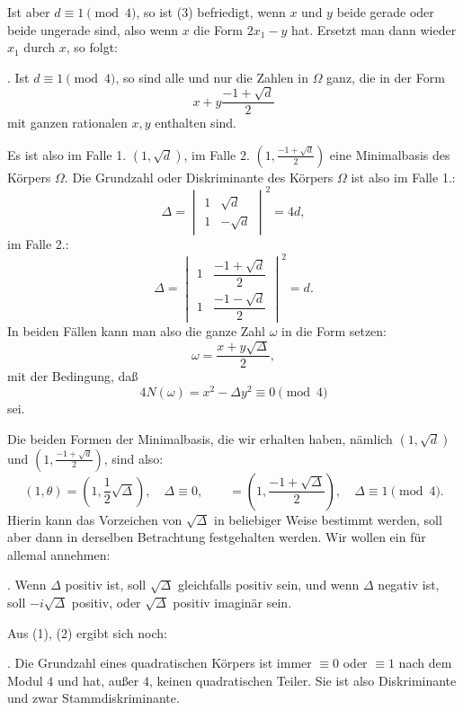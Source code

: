 \documentclass[11pt]{article}
\begin{document}
Ist aber $d\equiv1\pmod4$, so ist (3) befriedigt, wenn $x$ und $y$ beide gerade oder beide ungerade sind, also wenn $x$ die Form $2x_1-y$ hat. Ersetzt man dann wieder $x_1$ durch $x$, so folgt:

\medskip
{}. Ist $d\equiv1\pmod4$, so sind alle und nur die Zahlen in $\Omega$ ganz, die in der Form
\[
 x+y\frac{-1+\sqrt d}{2}
\]
mit ganzen rationalen $x,y$ enthalten sind.
\medskip

Es ist also im Falle 1. $(1,\sqrt d)$, im Falle 2. $\left(1,\frac{-1+\sqrt d}{2}\right)$ eine Minimalbasis des Körpers $\Omega$. Die Grundzahl oder Diskriminante des Körpers $\Omega$ ist also im Falle 1.:
\begin{equation}
 \Delta=\begin{vmatrix}
 1&\sqrt d\\
 1&-\sqrt d
 \end{vmatrix}^{2}=4d,
\tag{5}
\end{equation}
im Falle 2.:
\begin{equation}
 \Delta=\begin{vmatrix}
 1&\dfrac{-1+\sqrt d}{2}\\[0.35em]
 1&\dfrac{-1-\sqrt d}{2}
 \end{vmatrix}^{2}=d.
\tag{6}
\end{equation}
In beiden Fällen kann man also die ganze Zahl $\omega$ in die Form setzen:
\begin{equation}
 \omega=\frac{x+y\sqrt\Delta}{2},
\tag{7}
\end{equation}
mit der Bedingung, daß
\begin{equation}
 4N(\omega)=x^2-\Delta y^2\equiv0\pmod4
\tag{8}
\end{equation}
sei.

Die beiden Formen der Minimalbasis, die wir erhalten haben, nämlich $(1,\sqrt d)$ und $\left(1,\frac{-1+\sqrt d}{2}\right)$, sind also:
\begin{equation}
 (1,\theta)=\left(1,\frac12\sqrt\Delta\right),\quad \Delta\equiv0,\qquad
 =\left(1,\frac{-1+\sqrt\Delta}{2}\right),\quad \Delta\equiv1\pmod4.
\tag{9}
\end{equation}
Hierin kann das Vorzeichen von $\sqrt\Delta$ in beliebiger Weise bestimmt werden, soll aber dann in derselben Betrachtung festgehalten werden. Wir wollen ein für allemal annehmen:

\medskip
{}. Wenn $\Delta$ positiv ist, soll $\sqrt\Delta$ gleichfalls positiv sein, und wenn $\Delta$ negativ ist, soll $-i\sqrt\Delta$ positiv, oder $\sqrt\Delta$ positiv imaginär sein.
\medskip

Aus (1), (2) ergibt sich noch:

\medskip
{}. Die Grundzahl eines quadratischen Körpers ist immer $\equiv0$ oder $\equiv1$ nach dem Modul $4$ und hat, außer $4$, keinen quadratischen Teiler. Sie ist also Diskriminante und zwar Stammdiskriminante.
\end{document}
